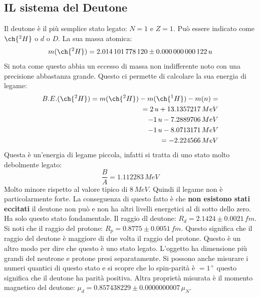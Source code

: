 \subsection{IL sistema del Deutone}
Il deutone è il più semplice stato legato: $N=1$ e $Z=1$. Può essere indicato come $\ch{^2H}$ o $d$ o $D$. La sua massa atomica:
\begin{equation*}
    m(\ch{^2H})=2.014\,101\,778\,120\pm0.000\,000\,000\,122\,u
\end{equation*}
Si nota come questo abbia un eccesso di massa non indifferente noto con una precisione abbastanza grande. Questo ci permette di calcolare la sua energia di legame:
\begin{align*}
B.E.(\ch{^2H})=m(\ch{^2H})-m(\ch{^1H})-m(n)= \\
=2\,u+13.1357217\,MeV \\
-1\,u-7.2889706\,MeV \\
-1\,u-8.0713171\,MeV \\
=-2.224566\,MeV
\end{align*}
Questa è un'energia di legame piccola, infatti si tratta di uno stato molto debolmente legato:
\begin{equation*}
    \frac{B}{A}=1.112283\,MeV
\end{equation*}
Molto minore rispetto al valore tipico di $8\,MeV$. Quindi il legame non è particolarmente forte. La conseguenza di questo fatto è che \textbf{non esistono stati eccitati} il deutone non può e non ha altri livelli energetici al di sotto dello zero. Ha solo questo stato fondamentale. Il raggio dl deutone: $R_d=2.1424\pm0.0021\,fm$. Si noti che il raggio del protone: $R_p=0.8775\pm0.0051\,fm$. Questo significa che il raggio del deutone è maggiore di due volta il raggio del protone. Questo è un altro modo per dire che questo è uno stato legato. L'oggetto ha dimensione più grandi del neutrone e protone presi separatamente. Si possono anche misurare i numeri quantici di questo stato e si scopre che lo spin-parità è $=1^+$ questo significa che il deutone ha parità positiva. Altra proprietà misurata è il momento magnetico del deutone: $\mu_d=0.857438229\pm0.0000000007\,\mu_N$.
